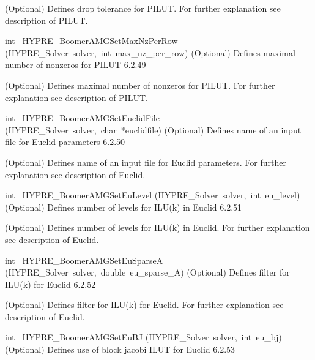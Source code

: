 \documentclass{article}
\begin{document}
\begin{cxxentry}
\begin{cxxentry}
\begin{cxxfunction}
\begin{cxxdoc}
(Optional) Defines drop tolerance for PILUT.
For further explanation see description of PILUT.
\end{cxxdoc}
\end{cxxfunction}
\begin{cxxfunction}
{int\ }
        {HYPRE\_BoomerAMGSetMaxNzPerRow}
        {(HYPRE\_Solver\ solver,\ int\ max\_nz\_per\_row)}
        {
(Optional) Defines maximal number of nonzeros for PILUT}
        {6.2.49}
\begin{cxxdoc}

(Optional) Defines maximal number of nonzeros for PILUT.
For further explanation see description of PILUT.
\end{cxxdoc}
\end{cxxfunction}
\begin{cxxfunction}
{int\ }
        {HYPRE\_BoomerAMGSetEuclidFile}
        {(HYPRE\_Solver\ solver,\ char\ *euclidfile)}
        {
(Optional) Defines name of an input file for Euclid parameters}
        {6.2.50}
\begin{cxxdoc}

(Optional) Defines name of an input file for Euclid parameters.
For further explanation see description of Euclid.
\end{cxxdoc}
\end{cxxfunction}
\begin{cxxfunction}
{int\ }
        {HYPRE\_BoomerAMGSetEuLevel}
        {(HYPRE\_Solver\ solver,\ int\ eu\_level)}
        {
(Optional) Defines number of levels for ILU(k) in Euclid}
        {6.2.51}
\begin{cxxdoc}

(Optional) Defines number of levels for ILU(k) in Euclid.
For further explanation see description of Euclid.
\end{cxxdoc}
\end{cxxfunction}
\begin{cxxfunction}
{int\ }
        {HYPRE\_BoomerAMGSetEuSparseA}
        {(HYPRE\_Solver\ solver,\ double\ eu\_sparse\_A)}
        {
(Optional) Defines filter for ILU(k) for Euclid}
        {6.2.52}
\begin{cxxdoc}

(Optional) Defines filter for ILU(k) for Euclid.
For further explanation see description of Euclid.
\end{cxxdoc}
\end{cxxfunction}
\begin{cxxfunction}
{int\ }
        {HYPRE\_BoomerAMGSetEuBJ}
        {(HYPRE\_Solver\ solver,\ int\ eu\_bj)}
        {
(Optional) Defines use of block jacobi ILUT for Euclid}
        {6.2.53}
\begin{cxxdoc}


\end{cxxdoc}
\end{cxxfunction}
\end{cxxentry}
\end{cxxentry}
\end{document}
